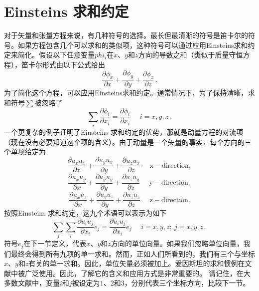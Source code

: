 \documentclass[MathematicsNumericsDerivationsAndOpenFOAM.tex]{subfiles}
\begin{document}
\section{Einsteins 求和约定}
%
%
	对于矢量和张量方程来说，有几种符号的选择。最长但最清晰的符号是笛卡尔的符号。如果方程包含几个可以求和的类似项，这种符号可以通过应用Einsteins求和约定来简化。假设以下任意变量$phi_i$在$x$、$y$和$z$方向的导数之和（类似于质量守恒方程），笛卡尔形式由以下公式给出
%
%
\begin{equation*}
 \frac{\partial \phi_x}{\partial x}
+\frac{\partial \phi_y}{\partial y}
+\frac{\partial \phi_z}{\partial z} ~.
\end{equation*}
%
%
	为了简化这个方程，可以应用Einsteins求和约定。通常情况下，为了保持清晰，求和符号$\sum$被忽略了
%
%
\begin{equation}
  \sum_{i} \frac{\partial \phi_i}{\partial x_i}
=
  \frac{\partial \phi_i}{\partial x_i} ~~~~~~ i=x,y,z ~.
\end{equation}
%
%
    一个更复杂的例子证明了Einsteins 求和约定的优势，那就是动量方程的对流项（现在没有必要知道这个项的含义）。由于动量是一个矢量的事实，每个方向的三个单项给定为
%
%
\begin{equation*}
 \frac{\partial u_x u_x}{\partial x}
 +
 \frac{\partial u_y u_x}{\partial y}
 +
    \frac{\partial u_z u_x}{\partial z}~~~~~~ \mathrm{x-direction},
\end{equation*}
%
%
\begin{equation*}
 \frac{\partial u_x u_y}{\partial x}
 +
 \frac{\partial u_y u_y}{\partial y}
 +
    \frac{\partial u_z u_y}{\partial z}~~~~~~ \mathrm{y-direction},
\end{equation*}
%
%
\begin{equation*}
 \frac{\partial u_x u_z}{\partial x}
 +
 \frac{\partial u_y u_z}{\partial y}
 +
    \frac{\partial u_z u_z}{\partial z}~~~~~~ \mathrm{z-direction}.
\end{equation*}
%
%
按照Einsteins 求和约定，这九个术语可以表示为如下
%
%
\begin{equation}
 \sum_j \sum_i \frac{\partial u_i u_j}{\partial x_i} e_j =  \frac{\partial u_i u_j}{\partial x_i} e_j ~~~~~~i=x,y,z; ~j=x,y,z~.
\end{equation}
%
%
    符号$e_j$在下一节定义，代表$x$、$y$和$z$方向的单位向量。如果我们忽略单位向量，我们最终会得到所有九项的单一求和。然而，正如人们所看到的，我们有三个与坐标$x$、$y$和$z$有关的单一求和。因此，单位矢量必须被加上。爱因斯坦的求和惯例在文献中被广泛使用。因此，了解它的含义和应用方式是非常重要的。
%
%
    请记住，在大多数文献中，变量$i$和$j$被设定为$1$、$2$和$3$，分别代表三个坐标方向，比较下一节。
%
%
\end{document}

